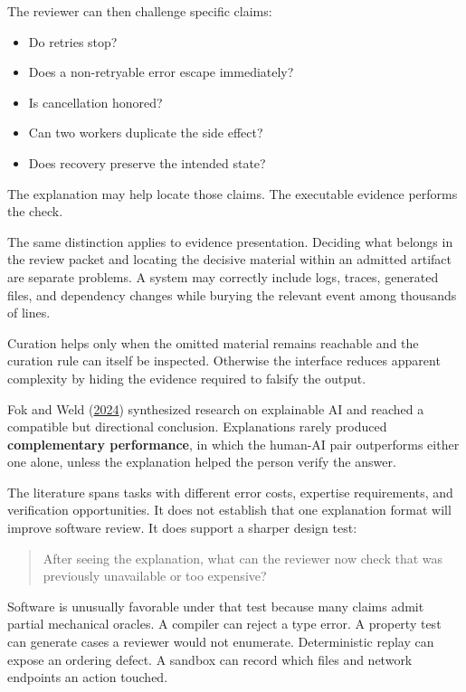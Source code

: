 
The reviewer can then challenge specific claims:

\begin{itemize}
\tightlist
\item
  Do retries stop?
\item
  Does a non-retryable error escape immediately?
\item
  Is cancellation honored?
\item
  Can two workers duplicate the side effect?
\item
  Does recovery preserve the intended state?
\end{itemize}

The explanation may help locate those claims. The executable evidence performs the check.

The same distinction applies to evidence presentation. Deciding what belongs in the review packet and locating the decisive material within an admitted artifact are separate problems. A system may correctly include logs, traces, generated files, and dependency changes while burying the relevant event among thousands of lines.

Curation helps only when the omitted material remains reachable and the curation rule can itself be inspected. Otherwise the interface reduces apparent complexity by hiding the evidence required to falsify the output.

Fok and Weld (\href{https://arxiv.org/abs/2305.07722}{2024}) synthesized research on explainable AI and reached a compatible but directional conclusion. Explanations rarely produced \textbf{complementary performance}, in which the human-AI pair outperforms either one alone, unless the explanation helped the person verify the answer.

The literature spans tasks with different error costs, expertise requirements, and verification opportunities. It does not establish that one explanation format will improve software review. It does support a sharper design test:

\begin{quote}
After seeing the explanation, what can the reviewer now check that was previously unavailable or too expensive?
\end{quote}

Software is unusually favorable under that test because many claims admit partial mechanical oracles. A compiler can reject a type error. A property test can generate cases a reviewer would not enumerate. Deterministic replay can expose an ordering defect. A sandbox can record which files and network endpoints an action touched.

